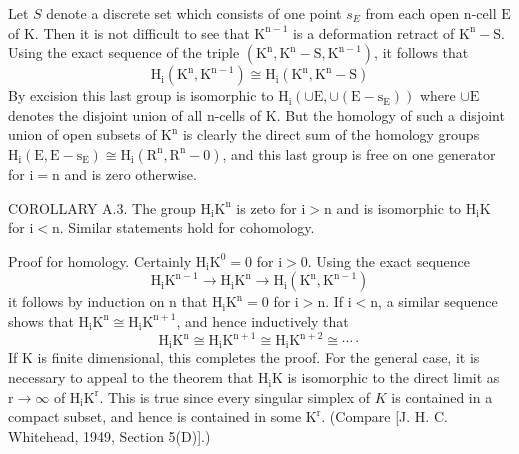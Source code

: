 \documentclass[10pt]{article}
\begin{document}
Let $S$ denote a discrete set which consists of one point $s_{E}$ from each open $\mathrm{n}$-cell $\mathrm{E}$ of $\mathrm{K}$. Then it is not difficult to see that $\mathrm{K}^{\mathrm{n}-1}$ is a deformation retract of $\mathrm{K}^{\mathrm{n}}-\mathrm{S}$. Using the exact sequence of the triple $\left(\mathrm{K}^{\mathrm{n}}, \mathrm{K}^{\mathrm{n}}-\mathrm{S}, \mathrm{K}^{\mathrm{n}-1}\right)$, it follows that
$$
\mathrm{H}_{\mathrm{i}}\left(\mathrm{K}^{\mathrm{n}}, \mathrm{K}^{\mathrm{n}-1}\right) \cong \mathrm{H}_{\mathrm{i}}\left(\mathrm{K}^{\mathrm{n}}, \mathrm{K}^{\mathrm{n}}-\mathrm{S}\right)
$$
By excision this last group is isomorphic to $\mathrm{H}_{\mathrm{i}}\left(\cup \mathrm{E}, \cup\left(\mathrm{E}-\mathrm{s}_{\mathrm{E}}\right)\right)$ where $\cup \mathrm{E}$ denotes the disjoint union of all $\mathrm{n}$-cells of $\mathrm{K}$. But the homology of such a disjoint union of open subsets of $\mathrm{K}^{\mathrm{n}}$ is clearly the direct sum of the homology groups $\mathrm{H}_{\mathrm{i}}\left(\mathrm{E}, \mathrm{E}-\mathrm{s}_{\mathrm{E}}\right) \cong \mathrm{H}_{\mathrm{i}}\left(\mathrm{R}^{\mathrm{n}}, \mathrm{R}^{\mathrm{n}}-0\right)$, and this last group is free on one generator for $\mathrm{i}=\mathrm{n}$ and is zero otherwise.

COROLLARY A.3. The group $\mathrm{H}_{\mathrm{i}} \mathrm{K}^{\mathrm{n}}$ is zeto for $\mathrm{i}>\mathrm{n}$ and is isomorphic to $\mathrm{H}_{\mathrm{i}} \mathrm{K}$ for $\mathrm{i}<\mathrm{n}$. Similar statements hold for cohomology.

Proof for homology. Certainly $\mathrm{H}_{\mathrm{i}} \mathrm{K}^{0}=0$ for $\mathrm{i}>0$. Using the exact sequence
$$
\mathrm{H}_{\mathrm{i}} \mathrm{K}^{\mathrm{n}-1} \rightarrow \mathrm{H}_{\mathrm{i}} \mathrm{K}^{\mathrm{n}} \rightarrow \mathrm{H}_{\mathrm{i}}\left(\mathrm{K}^{\mathrm{n}}, \mathrm{K}^{\mathrm{n}-1}\right)
$$
it follows by induction on $\mathrm{n}$ that $\mathrm{H}_{\mathrm{i}} \mathrm{K}^{\mathrm{n}}=0$ for $\mathrm{i}>\mathrm{n}$. If $\mathrm{i}<\mathrm{n}$, a similar sequence shows that $\mathrm{H}_{\mathrm{i}} \mathrm{K}^{\mathrm{n}} \cong \mathrm{H}_{\mathrm{i}} \mathrm{K}^{\mathrm{n}+1}$, and hence inductively that
$$
\mathrm{H}_{\mathrm{i}} \mathrm{K}^{\mathrm{n}} \cong \mathrm{H}_{\mathrm{i}} \mathrm{K}^{\mathrm{n}+1} \cong \mathrm{H}_{\mathrm{i}} \mathrm{K}^{\mathrm{n}+2} \cong \cdots \cdot
$$
If $\mathrm{K}$ is finite dimensional, this completes the proof. For the general case, it is necessary to appeal to the theorem that $\mathrm{H}_{\mathrm{i}} \mathrm{K}$ is isomorphic to the direct limit as $\mathrm{r} \rightarrow \infty$ of $\mathrm{H}_{\mathrm{i}} \mathrm{K}^{\mathrm{r}}$. This is true since every singular simplex of $K$ is contained in a compact subset, and hence is contained in some $\mathrm{K}^{\mathrm{r}}$. (Compare [J. H. C. Whitehead, 1949, Section 5(D)].)
\end{document}
